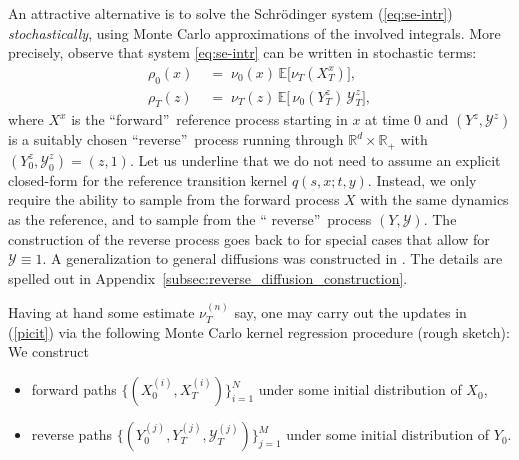 \documentclass[a4paper,11pt]{amsart}
\theoremstyle{plain}
\theoremstyle{remark}
\begin{document}
An attractive alternative is to solve the Schr\"{o}dinger system
(\ref{eq:se-intr}) \emph{stochastically}, using Monte Carlo approximations of
the involved integrals. More precisely, observe that system \eqref{eq:se-intr}
can be written in stochastic terms:
\begin{align}
\rho_{0}(x) &  \;=\;\nu_{0}(x)\,\mathbb{E}\bigl[\nu
_{T}(X_{T}^{x})\bigr],\label{eq:schr-exp-1}\\
\rho_{T}(z) &  \;=\;\nu_{T}(z)\,\mathbb{E}\bigl[\,\nu_{0}(Y_{T}^{z}%
)\,\mathcal{Y}_{T}^{z}\bigr],\label{eq:schr-exp-2}
\end{align}
where $X^{x}$ is the \textquotedblleft forward\textquotedblright\ reference
process starting in $x$ at time $0$ and $(Y^{z},\mathcal{Y}^{z})$ is a
suitably chosen \textquotedblleft reverse\textquotedblright\ process running
through $\mathbb{R}^{d}\times\mathbb{R}_{+}$ with $(Y_{0}^{z},\mathcal{Y}%
_{0}^{z})=(z,1)$. Let us underline that we do not need to assume an explicit
closed-form for the reference transition kernel $q(s,x;t,y)$. Instead, we only
require the ability to sample from the forward process $X$ with the same
dynamics as the reference, and to sample from the \textquotedblleft
reverse\textquotedblright\ process $(Y,\mathcal{Y})$. The construction of the
reverse process goes back to \cite{Thomson1987} for special cases that allow
for $\mathcal{Y}\equiv1$. A generalization to general diffusions was
constructed in \cite{MSS2004}. The details are spelled out in
Appendix~\ref{subsec:reverse_diffusion_construction}.

Having at hand some estimate $\nu_{T}^{(n)}$ say, one may carry out the
updates in (\ref{picit}) via the following Monte Carlo kernel regression
procedure (rough sketch): We construct

\begin{itemize}
\item forward paths $\{(X_{0}^{(i)},X_{T}^{(i)})\}_{i=1}^{N}$ under some
initial distribution of $X_{0}$,

\item reverse paths $\{(Y_{0}^{(j)},Y_{T}^{(j)},\mathcal{Y}_{T}^{(j)}%
)\}_{j=1}^{M}$ under some initial distribution of $Y_{0}$.
\end{itemize}
\end{document}
